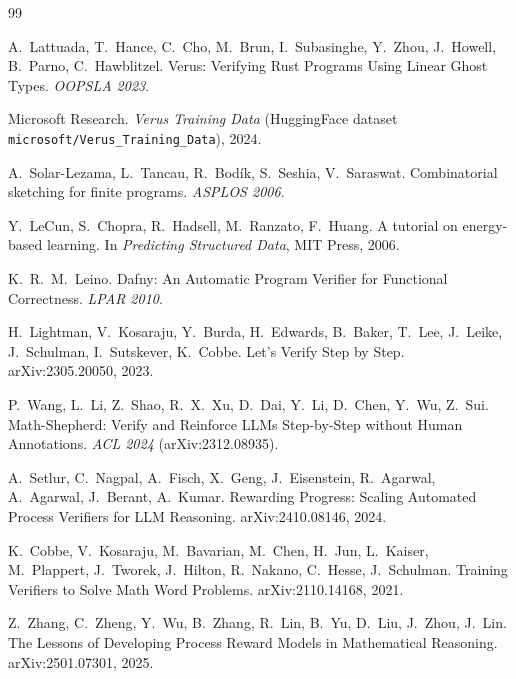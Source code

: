\documentclass[10pt]{article}
\begin{document}
\begin{thebibliography}{99}\small

A.~Lattuada, T.~Hance, C.~Cho, M.~Brun, I.~Subasinghe, Y.~Zhou, J.~Howell,
B.~Parno, C.~Hawblitzel.
\newblock Verus: Verifying Rust Programs Using Linear Ghost Types.
\newblock \emph{OOPSLA 2023}.

Microsoft Research.
\newblock \emph{Verus Training Data} (HuggingFace dataset
\texttt{microsoft/Verus\_Training\_Data}), 2024.

A.~Solar-Lezama, L.~Tancau, R.~Bod\'{i}k, S.~Seshia, V.~Saraswat.
\newblock Combinatorial sketching for finite programs.
\newblock \emph{ASPLOS 2006}.

Y.~LeCun, S.~Chopra, R.~Hadsell, M.~Ranzato, F.~Huang.
\newblock A tutorial on energy-based learning.
\newblock In \emph{Predicting Structured Data}, MIT Press, 2006.

K.~R.~M.~Leino.
\newblock Dafny: An Automatic Program Verifier for Functional Correctness.
\newblock \emph{LPAR 2010}.

H.~Lightman, V.~Kosaraju, Y.~Burda, H.~Edwards, B.~Baker, T.~Lee, J.~Leike,
J.~Schulman, I.~Sutskever, K.~Cobbe.
\newblock Let's Verify Step by Step.
\newblock arXiv:2305.20050, 2023.

P.~Wang, L.~Li, Z.~Shao, R.~X.~Xu, D.~Dai, Y.~Li, D.~Chen, Y.~Wu, Z.~Sui.
\newblock Math-Shepherd: Verify and Reinforce LLMs Step-by-Step without
Human Annotations.
\newblock \emph{ACL 2024} (arXiv:2312.08935).

A.~Setlur, C.~Nagpal, A.~Fisch, X.~Geng, J.~Eisenstein, R.~Agarwal,
A.~Agarwal, J.~Berant, A.~Kumar.
\newblock Rewarding Progress: Scaling Automated Process Verifiers for LLM
Reasoning.
\newblock arXiv:2410.08146, 2024.

K.~Cobbe, V.~Kosaraju, M.~Bavarian, M.~Chen, H.~Jun, L.~Kaiser, M.~Plappert,
J.~Tworek, J.~Hilton, R.~Nakano, C.~Hesse, J.~Schulman.
\newblock Training Verifiers to Solve Math Word Problems.
\newblock arXiv:2110.14168, 2021.

Z.~Zhang, C.~Zheng, Y.~Wu, B.~Zhang, R.~Lin, B.~Yu, D.~Liu, J.~Zhou, J.~Lin.
\newblock The Lessons of Developing Process Reward Models in Mathematical
Reasoning.
\newblock arXiv:2501.07301, 2025.


\end{thebibliography}
\end{document}

